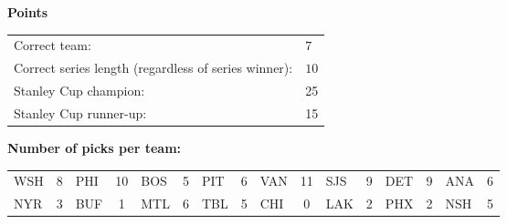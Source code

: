 \documentclass[10pt]{article}
\begin{document}
{\bf Points}\\
\begin{minipage}{12cm}
    \begin{tabular}{l l}
        Correct team:	& $7$\\
        Correct series length (regardless of series winner):	& $10$\\
        Stanley Cup champion:	& 25\\
        Stanley Cup runner-up:	& 15\\
    \end{tabular}

    \vspace{1cm}
    {\bf Number of picks per team:}\\
    \begin{tabular}{lc | lc | lc | lc | lc | lc | lc | lc }
        WSH & 8 & PHI & 10 & BOS & 5 & PIT & 6 & VAN & 11 & SJS & 9 & DET & 9 & ANA & 6 \\
        NYR & 3 & BUF & 1 & MTL & 6 & TBL & 5 & CHI & 0 & LAK & 2 & PHX & 2 & NSH & 5 \\
    \end{tabular}
\end{minipage}
\end{document}
